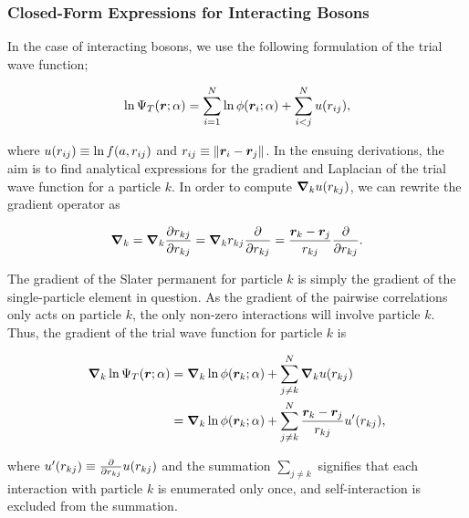\subsubsection{Closed-Form Expressions for Interacting Bosons}

In the case of interacting bosons, we use the following formulation of the trial wave function;

\begin{equation*}
    \ln \Psi_T \qty(\bm{r}; \alpha) = \sum_{i=1}^N \ln \phi \qty(\bm{r}_i ; \alpha) + \sum_{i<j}^N u \qty(r_{ij}),
\end{equation*}

where $u \qty(r_{ij}) \equiv \ln f \qty(a, r_{ij})$ and $r_{ij} \equiv \norm{\bm{r}_i - \bm{r}_j}$. In the ensuing derivations, the aim is to find analytical expressions for the gradient and Laplacian of the trial wave function for a particle $k$. In order to compute $\grad_k u \qty(r_{kj})$, we can rewrite the gradient operator as 

\begin{equation*}
    \grad_k = \grad_k \pdv{r_{kj}}{r_{kj}} = \grad_k r_{kj} \pdv{r_{kj}} = \frac{\bm{r}_k - \bm{r}_j}{r_{kj}} \pdv{r_{kj}} .
\end{equation*}

The gradient of the Slater permanent for particle $k$ is simply the gradient of the single-particle element in question. As the gradient of the pairwise correlations only acts on particle $k$, the only non-zero interactions will involve particle $k$. Thus, the gradient of the trial wave function for particle $k$ is 

\begin{equation}
\begin{aligned}
    \grad_k \ln \Psi_T \qty(\bm{r}; \alpha) &= \grad_k \ln \phi \qty(\bm{r}_k; \alpha) + \sum_{j \neq k}^N \grad_k u \qty(r_{kj}) 
    \\
    &= \grad_k \ln \phi \qty(\bm{r}_k; \alpha) + \sum_{j \neq k}^N \frac{\bm{r}_k - \bm{r}_j}{r_{kj}} u' \qty(r_{kj}),
\end{aligned}
\end{equation} 

where $u' \qty(r_{kj}) \equiv \pdv{r_{kj}} u \qty(r_{kj})$ and the summation $\sum_{j\neq k}$ signifies that each interaction with particle $k$ is enumerated only once, and self-interaction is excluded from the summation. 

